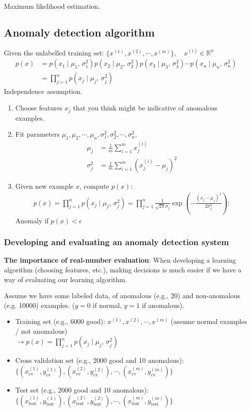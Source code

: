 Maximum likelihood estimation.

%
\subsection{Anomaly detection algorithm}
Given the unlabelled training set: $\{x^{(1)}, x^{(2)}, \cdots, x^{(m)}\}, \quad x^{(i)} \in \mathbb{R}^n$
\begin{align*}
p(x) &= p(x_1\mid \mu_1,\,\sigma^{2}_1)p(x_2\mid \mu_2,\,\sigma^{2}_2)p(x_3\mid \mu_3,\,\sigma^{2}_3) \cdots p(x_n\mid \mu_n,\,\sigma^{2}_n) \\
&= \prod_{j=1}^np(x_j\mid \mu_j,\,\sigma^{2}_j)
\end{align*}
Independence assumption.

\begin{enumerate}
\item
Choose features $x_j$ that you think might be indicative of anomalous examples.
\item
Fit parameters $\mu_1, \mu_2, \cdots, \mu_n, \sigma^{2}_1, \sigma^{2}_2, \cdots, \sigma^{2}_n,$
\begin{align*}
\mu_j &= \frac{1}{m}\sum_{i=1}^mx^{(i)}_j\\
\sigma^{2}_j &= \frac{1}{m}\sum_{i=1}^m(x^{(i)}_j-\mu_j)^2
\end{align*}
\item
Given new example $x$, compute $p(x)$:
\begin{align*}
p(x)= \prod_{j=1}^np(x_j\mid \mu_j,\,\sigma^{2}_j) 
= \prod_{j=1}^n\frac{1}{\sqrt{2\pi}\sigma_j}\exp{(-\frac{(x_j-\mu_j)^2}{2\sigma_j^{2}})}:
\end{align*}
Anomaly if $p(x) < \epsilon$
\end{enumerate}

\subsubsection{Developing and evaluating an anomaly detection system}
\textbf{The importance of real-number evaluation}: When developing a learning algorithm (choosing features, etc.), making decisions is much easier if we have a way of evaluating our learning algorithm.

Assume we have some labeled data, of anomalous (e.g., 20) and non-anomalous (e.g. 10000) examples. ($y = 0$ if normal, $y = 1$ if anomalous).
\begin{itemize}
\item[]
Training set (e.g., 6000 good): $x^{(1)}, x^{(2)}, \cdots, x^{(m)}$ (assume normal examples / not anomalous)\\
$\rightarrow p(x)= \prod_{j=1}^np(x_j\mid \mu_j,\,\sigma^{2}_j) $ 
\item[]
Cross validation set (e.g., 2000 good and 10 anomalous):  $\{(x^{(1)}_{\text{cv}}, y^{(1)}_{\text{cv}}), (x^{(2)}_{\text{cv}}, y^{(2)}_{\text{cv}}), \cdots, (x^{(m)}_{\text{cv}}, y^{(m)}_{\text{cv}})\}$
\item[]
Test set (e.g., 2000 good and 10 anomalous):  $\{(x^{(1)}_{\text{test}}, y^{(1)}_{\text{test}}), (x^{(2)}_{\text{test}}, y^{(2)}_{\text{test}}), \cdots, (x^{(m)}_{\text{test}}, y^{(m)}_{\text{test}})\}$
\end{itemize}

